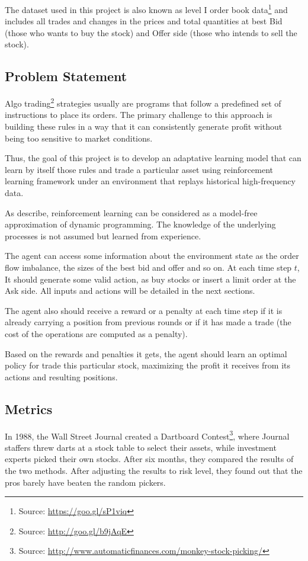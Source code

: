 \documentclass[a4paper]{article}
\begin{document}
The dataset used in this project is also known as level I order book data\footnote{Source: \url{https://goo.gl/sP1viq}} and includes all trades and changes in the prices and total quantities at best Bid (those who wants to buy the stock) and Offer side (those who intends to sell the stock).


\subsection{Problem Statement}
Algo trading\footnote{Source: \url{http://goo.gl/b9jAqE}} strategies usually are programs that follow a predefined set of instructions to place its orders. The primary challenge to this approach is building these rules in a way that it can consistently generate profit without being too sensitive to market conditions.

Thus, the goal of this project is to develop an adaptative learning model that can learn by itself those rules and trade a particular asset using reinforcement learning framework under an environment that replays historical high-frequency data.

As \cite{chan2001electronic} describe, reinforcement learning can be considered as a model-free approximation of dynamic programming. The knowledge of the underlying processes is not assumed but learned from experience.

The agent can access some information about the environment state as the order flow imbalance, the sizes of the best bid and offer and so on. At each time step $t$, It should generate some valid action, as buy stocks or insert a limit order at the Ask side. All inputs and actions will be detailed in the next sections.

The agent also should receive a reward or a penalty at each time step if it is already carrying a position from previous rounds or if it has made a trade (the cost of the operations are computed as a penalty).

Based on the rewards and penalties it gets, the agent should learn an optimal policy for trade this particular stock, maximizing the profit it receives from its actions and resulting positions.

\subsection{Metrics}
In 1988, the Wall Street Journal created a Dartboard Contest\footnote{Source: \url{http://www.automaticfinances.com/monkey-stock-picking/}}, where Journal staffers threw darts at a stock table to select their assets, while investment experts picked their own stocks. After six months, they compared the results of the two methods. After adjusting the results to risk level, they found out that the pros barely have beaten the random pickers.
\end{document}
